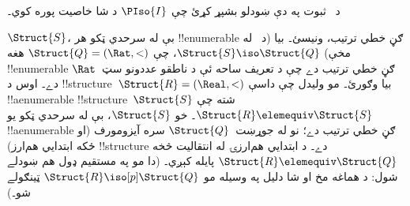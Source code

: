 \documentclass[../../../include/open-logic-section]{subfiles}
\begin{document}
\begin{prob}
  د~ ثبوت په دې ښودلو بشپړ کړئ چې
  $\PIso{I}$ د شا خاصيت پوره کوي۔
\end{prob}

\begin{rem}
  $\Struct{S}$، بې له سرحدي ټکو هر !!{enumerable} ګڼ خطي ترتيب،
  ونيسئ۔ بيا (د~ له مخې) $\Struct{S} \iso
  \Struct{Q}$، چې $\Struct{Q} = (\Rat, <)$ هغه !!{enumerable} ګڼ
  خطي ترتيب دے چې د تعريف ساحه ئې د ناطقو عددونو سټ~$\Rat$ دے۔ اوس د
   !!{structure}~$\Struct{R} = (\Real, <)$ بيا وګورئ۔ مو
  وليدل چې داسې !!a{enumerable} !!{structure}~$\Struct{S}$ شته چې
  $\Struct{R} \elemequiv \Struct{S}$۔ خو $\Struct{S}$، بې له سرحدي
  ټکو يو !!a{enumerable} ګڼ خطي ترتيب دے؛ نو له جوړښت~$\Struct{Q}$
  سره آيزومورف (او ځکه ابتدايي هم‌ارز) !!{structure} دے۔ د ابتدايي هم‌ارزۍ له
  انتقاليت څخه $\Struct{R} \elemequiv \Struct{Q}$ پايله کېږي۔ (دا مو
  په مستقيم ډول هم ښودلے شول: د هماغه مخ او شا دليل په وسيله مو
  $\Struct{R} \iso[p] \Struct{Q}$ ټينګولے شو۔)
\end{rem}
\end{document}
